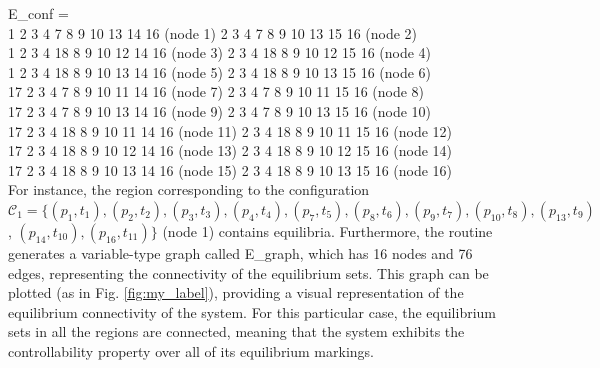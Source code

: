 E\_conf =\\
     1     2     3     4     7     8     9    10    13    14    16   (node 1)      2     3     4     7     8     9    10    13    15    16   (node 2)\\
     1     2     3     4    18     8     9    10    12    14    16 (node 3)      2     3     4    18     8     9    10    12    15    16 (node 4)\\
     1     2     3     4    18     8     9    10    13    14    16 (node 5)     2     3     4    18     8     9    10    13    15    16 (node 6)\\
    17     2     3     4     7     8     9    10    11    14    16 (node 7)     2     3     4     7     8     9    10    11    15    16 (node 8)\\
    17     2     3     4     7     8     9    10    13    14    16 (node 9)     2     3     4     7     8     9    10    13    15    16 (node 10)\\
    17     2     3     4    18     8     9    10    11    14    16 (node 11)     2     3     4    18     8     9    10    11    15    16 (node 12)\\
    17     2     3     4    18     8     9    10    12    14    16 (node 13)     2     3     4    18     8     9    10    12    15    16 (node 14)\\
    17     2     3     4    18     8     9    10    13    14    16 (node 15)     2     3     4    18     8     9    10    13    15    16 (node 16)\\

For instance, the region corresponding to the configuration $\mathcal{C}_1 = \{(p_1,t_1),(p_2,t_2),(p_3,t_3),(p_4,t_4),(p_7,t_5),(p_8,t_6),(p_9,t_7),(p_{10},t_8),(p_{13},t_9)$, $(p_{14},t_{10}),(p_{16},t_{11})\}$ (node 1) contains equilibria. Furthermore, the routine generates a variable-type graph called E\_graph, which has 16 nodes and 76 edges, representing the connectivity of the equilibrium sets. This graph can be plotted (as in Fig. \ref{fig:my_label}), providing a visual representation of the equilibrium connectivity of the system. For this particular case, the equilibrium sets in all the regions are connected, meaning that the system exhibits the controllability property over all of its equilibrium markings. 



